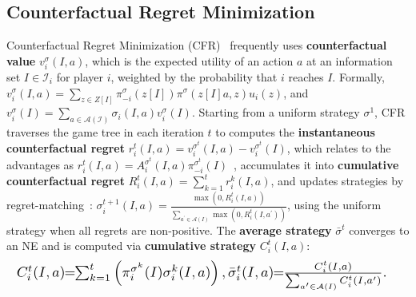 \documentclass[letterpaper]{article} %
\makeatletter
\renewenvironment{align*}{%
  \linenomath 
  \start@align\@ne\st@rredtrue\m@ne
}{%
  \endalign
  \endlinenomath 
}
\makeatother
\begin{document}
\subsection{Counterfactual Regret Minimization}
Counterfactual Regret Minimization (CFR)~\cite{zinkevich_regret_2007} frequently uses \textbf{counterfactual value} $v_i^\sigma(I, a)$, which is the expected utility of an action $a$ at an information set $I\in \mathcal{I}_i$ for player $i$, weighted by the probability that $i$ reaches $I$. Formally, $v_i^\sigma(I, a) = \sum_{z \in Z[I]}^{}\pi_{-i}^\sigma(z[I])\pi^\sigma(z[I]a, z) u_i(z)$, and $v_i^\sigma(I) = \sum_{a \in \mathcal{A(I)}}^{}\sigma_i(I, a)v_i^\sigma(I)$.
Starting from a uniform strategy $\sigma^1$, CFR traverses the game tree in each iteration $t$ to computes the \textbf{instantaneous counterfactual regret} $r^t_i(I, a)=v_i^{\sigma^t}(I, a)-v_i^{\sigma^t}(I)$, which relates to the advantages as $r_i^t(I, a)=A_i^{\sigma^t}(I, a)\pi_{-i}^{\sigma^t}(I)$~\cite{srinivasan2018actor}, accumulates it into \textbf{cumulative counterfactual regret} $R^t_i(I, a)=\sum_{k=1}^{t}r_i^{k}(I, a)$, and updates strategies by regret-matching~\cite{hart2000simple}: $\sigma_i^{t+1}(I, a)=\frac{\max(0, R_i^{t}(I, a))}{\sum_{a^{\prime} \in \mathcal{A}(I)}\max(0, R_{i}^{t}\left(I, a^{\prime}\right))}$, using the uniform strategy when  all regrets are non-positive.
The \textbf{average strategy} $\bar{\sigma}^t$ converges to an NE and is computed via \textbf{cumulative strategy} $C_i^t(I, a)$:
\begin{align*}
	\resizebox{0.93\linewidth}{!}{$
	\!\!\!\!\!C_i^{t}(I, a)\!\!=\!\!\sum_{k=1}^{t}\left(\pi_{i}^{\sigma^{k}}(I) \sigma_{i}^{k}(I, a)\right), \bar{\sigma}_i^t(I, a)\!\!=\!\!\frac{C_i^t(I,a)}{\sum_{a'\in\mathcal{A}(I)}C_i^t(I, a')}.
    $}
\end{align*}
\end{document}
